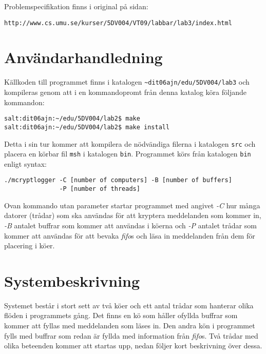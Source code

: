 \documentclass[a4paper, 12pt]{article}
\begin{document}
Problemspecifikation finns i original på sidan:\\
\begin{footnotesize}
\verb!http://www.cs.umu.se/kurser/5DV004/VT09/labbar/lab3/index.html!
\end{footnotesize}

\section{Användarhandledning}\label{sec:anvandarhandledning}
Källkoden till programmet finns i katalogen
\verb!~dit06ajn/edu/5DV004/lab3! och kompileras genom att i en
kommandopromt från denna katalog köra följande kommandon:

\begin{verbatim}
salt:dit06ajn:~/edu/5DV004/lab2$ make
salt:dit06ajn:~/edu/5DV004/lab2$ make install
\end{verbatim}

Detta i sin tur kommer att kompilera de nödvändiga filerna i katalogen
\verb!src! och placera en körbar fil \verb!msh! i katalogen
\verb!bin!. Programmet körs från katalogen \verb!bin! enligt syntax:

\begin{footnotesize}
\begin{verbatim}
./mcryptlogger -C [number of computers] -B [number of buffers]
               -P [number of threads]
\end{verbatim}
\end{footnotesize}

Ovan kommando utan parameter startar programmet med angivet
\textit{-C} hur många datorer (trådar) som ska användas för att
kryptera meddelanden som kommer in, \textit{-B} antalet buffrar som
kommer att användas i köerna och \textit{-P} antalet trådar som kommer
att användas för att bevaka \textit{fifo}s och läsa in meddelanden
från dem för placering i köer.

\section{Systembeskrivning}\label{sec:systembeskrivning}
Systemet består i stort sett av två köer och ett antal trådar som
hanterar olika flöden i programmets gång. Det finns en kö som håller
ofyllda buffrar som kommer att fyllas med meddelanden som läses in.
Den andra kön i programmet fylls med buffrar som redan är fyllda med
information från \textit{fifo}s. Två trådar med olika beteenden kommer
att startas upp, nedan följer kort beskrivning över dessa.
\end{document}
